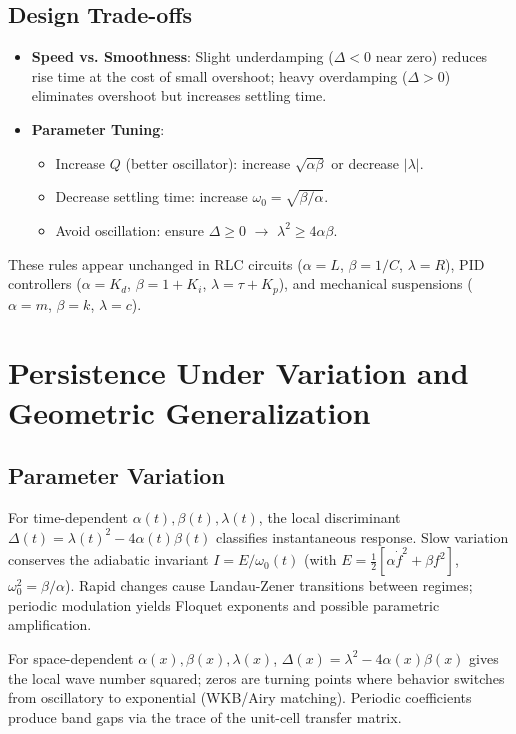 \documentclass[11pt]{article}
\begin{document}
\subsection{Design Trade-offs}
\begin{itemize}
\item \textbf{Speed vs. Smoothness}: Slight underdamping ($\Delta<0$ near zero) reduces rise time at the cost of small overshoot; heavy overdamping ($\Delta>0$) eliminates overshoot but increases settling time.
\item \textbf{Parameter Tuning}:
  \begin{itemize}
  \item Increase $Q$ (better oscillator): increase $\sqrt{\alpha\beta}$ or decrease $|\lambda|$.
  \item Decrease settling time: increase $\omega_0 = \sqrt{\beta/\alpha}$.
  \item Avoid oscillation: ensure $\Delta \geq 0$ $\rightarrow$ $\lambda^2 \geq 4\alpha\beta$.
  \end{itemize}
\end{itemize}
These rules appear unchanged in RLC circuits ($\alpha=L$, $\beta=1/C$, $\lambda=R$), PID controllers ($\alpha=K_d$, $\beta=1+K_i$, $\lambda=\tau+K_p$), and mechanical suspensions ($\alpha=m$, $\beta=k$, $\lambda=c$).

\section{Persistence Under Variation and Geometric Generalization}
\subsection{Parameter Variation}
For time-dependent $\alpha(t),\beta(t),\lambda(t)$, the local discriminant $\Delta(t) = \lambda(t)^2 - 4\alpha(t)\beta(t)$ classifies instantaneous response. Slow variation conserves the adiabatic invariant $I = E/\omega_0(t)$ (with $E = \frac12[\alpha\dot f^2 + \beta f^2]$, $\omega_0^2=\beta/\alpha$). Rapid changes cause Landau-Zener transitions between regimes; periodic modulation yields Floquet exponents and possible parametric amplification.

For space-dependent $\alpha(x),\beta(x),\lambda(x)$, $\Delta(x) = \lambda^2 - 4\alpha(x)\beta(x)$ gives the local wave number squared; zeros are turning points where behavior switches from oscillatory to exponential (WKB/Airy matching). Periodic coefficients produce band gaps via the trace of the unit-cell transfer matrix.
\end{document}

